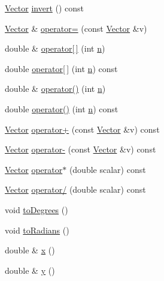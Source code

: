 \begin{DoxyCompactItemize}
\item 
\hyperlink{classimu_1_1Vector}{Vector} \hyperlink{classimu_1_1Vector_acc141ab477d76a2837ef78cd135ae952}{invert} () const 
\item 
\hyperlink{classimu_1_1Vector}{Vector} \& \hyperlink{classimu_1_1Vector_ab826fd628a3961be6cb6a42ccaa8430a}{operator=} (const \hyperlink{classimu_1_1Vector}{Vector} \&v)
\item 
double \& \hyperlink{classimu_1_1Vector_af6676995352fb6997e5065a566f6e327}{operator\mbox{[}$\,$\mbox{]}} (int \hyperlink{classimu_1_1Vector_acbe8633e10a39a8affc84be62cf8ea6d}{n})
\item 
double \hyperlink{classimu_1_1Vector_a1b55400fe612f5fc5b50dfb80072248c}{operator\mbox{[}$\,$\mbox{]}} (int \hyperlink{classimu_1_1Vector_acbe8633e10a39a8affc84be62cf8ea6d}{n}) const 
\item 
double \& \hyperlink{classimu_1_1Vector_af079ddffbc9cfdd614d527cf7b901665}{operator()} (int \hyperlink{classimu_1_1Vector_acbe8633e10a39a8affc84be62cf8ea6d}{n})
\item 
double \hyperlink{classimu_1_1Vector_a1d1925a289b276c1b54d8cd780f3c001}{operator()} (int \hyperlink{classimu_1_1Vector_acbe8633e10a39a8affc84be62cf8ea6d}{n}) const 
\item 
\hyperlink{classimu_1_1Vector}{Vector} \hyperlink{classimu_1_1Vector_ab7f18253745f4e86fe4f3252d7bebffa}{operator+} (const \hyperlink{classimu_1_1Vector}{Vector} \&v) const 
\item 
\hyperlink{classimu_1_1Vector}{Vector} \hyperlink{classimu_1_1Vector_aa25644b8800ad78b297d15c53dd19446}{operator-\/} (const \hyperlink{classimu_1_1Vector}{Vector} \&v) const 
\item 
\hyperlink{classimu_1_1Vector}{Vector} \hyperlink{classimu_1_1Vector_a87d58fa33f9b7c34f1f9997820e8b4d2}{operator$\ast$} (double scalar) const 
\item 
\hyperlink{classimu_1_1Vector}{Vector} \hyperlink{classimu_1_1Vector_a94b688ead9189f9a92c1935f734bc95c}{operator/} (double scalar) const 
\item 
void \hyperlink{classimu_1_1Vector_aa8c89e5fc2b3a18925a9c5ffb0fa5732}{to\+Degrees} ()
\item 
void \hyperlink{classimu_1_1Vector_ab927756f1e3dcfad401deaa56742c197}{to\+Radians} ()
\item 
double \& \hyperlink{classimu_1_1Vector_a45c7bc09d9f289703944799de61549f4}{x} ()
\item 
double \& \hyperlink{classimu_1_1Vector_a77f7da9eff3e43110f77ed45da8f4a59}{y} ()

\end{DoxyCompactItemize}
